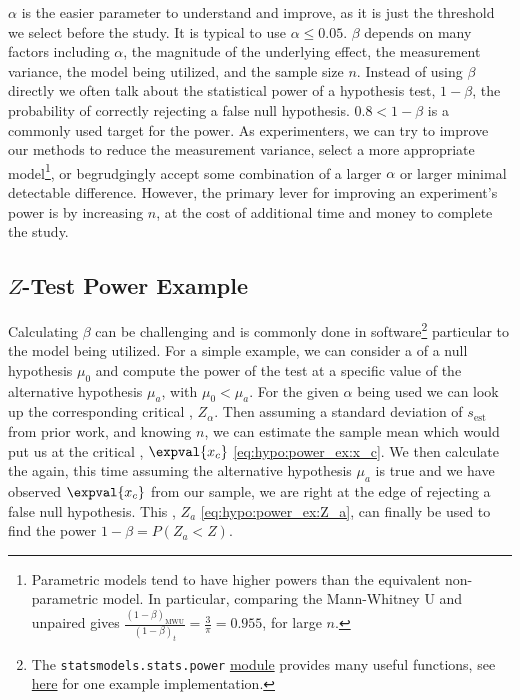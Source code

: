 $\alpha$ is the easier parameter to understand and improve,
as it is just the \pvalue threshold we select before the study.
It is typical to use $\alpha \leq \num{0.05}$.
$\beta$ depends on many factors including
$\alpha$,
the magnitude of the underlying effect,
the measurement variance,
the model being utilized,
and the sample size $n$.
Instead of using $\beta$ directly we often talk about the statistical power of a hypothesis test, $1-\beta$,
\ie the probability of correctly rejecting a false null hypothesis.
$\num{0.8} < 1-\beta$ is a commonly used target for the power.
As experimenters, we can
try to improve our methods to reduce the measurement variance,
select a more appropriate model\footnote{Parametric
models tend to have higher powers than the equivalent non-parametric model.
In particular, comparing
the Mann-Whitney U and unpaired \ttest gives $\frac{\left(1-\beta\right)_{\text{MWU}}}{\left(1-\beta\right)_{t}} = \frac{3}{\pi} = \num{0.955}$,
for large $n$.},
or begrudgingly accept some combination of a larger $\alpha$ or larger minimal detectable difference.
However, the primary lever for improving an experiment's power is by increasing $n$,
at the cost of additional time and money to complete the study.

\subsection{\texorpdfstring{$Z$}{Z}-Test Power Example}
\label{hypo:power:Z_example}

Calculating $\beta$ can be challenging and is commonly done in software\footnote{The \texttt{statsmodels.stats.power}
\href{https://www.statsmodels.org/dev/stats.html?highlight=statsmodels\%20stats\%20power\#power-and-sample-size-calculations}{module}
provides many useful functions, see \href{https://machinelearningmastery.com/statistical-power-and-power-analysis-in-python/}{here} for one example implementation.} particular to the model being utilized.
For a simple example, we can consider a \Ztest of a null hypothesis $\mu_{0}$
and compute the power of the test at a specific value of the alternative hypothesis $\mu_{a}$, with $\mu_{0} < \mu_{a}$.
For the given $\alpha$ being used we can look up the corresponding critical \Zscore, $Z_{\alpha}$.
Then assuming a standard deviation of $s_{\text{est}}$ from prior work,
and knowing $n$, we can estimate the sample mean
which would put us at the critical \Zscore, $\expval{x_{c}}$ \cref{eq:hypo:power_ex:x_c}.
We then calculate the \Zscore again, this time assuming the alternative hypothesis $\mu_{a}$ is true
and we have observed $\expval{x_{c}}$ from our sample, \ie we are right at the edge of rejecting a false null hypothesis.
This \Zscore, $Z_{a}$ \cref{eq:hypo:power_ex:Z_a}, can finally be used to find the power $1-\beta = P\left(Z_{a} < Z\right)$.

